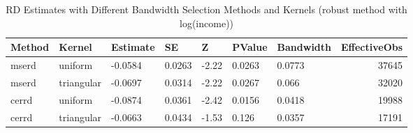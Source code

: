\begin{table}[ht]
\centering
\caption{RD Estimates with Different Bandwidth Selection Methods and Kernels (robust method with log(income))} 
\label{tab:rd_bandwidth_kernel_results_robust}
\begin{tabular}{lllllllr}
  \hline
Method & Kernel & Estimate & SE & Z & PValue & Bandwidth & EffectiveObs \\ 
  \hline
mserd & uniform & -0.0584 & 0.0263 & -2.22 & 0.0263 & 0.0773 & 37645 \\ 
  mserd & triangular & -0.0697 & 0.0314 & -2.22 & 0.0267 & 0.066 & 32020 \\ 
  cerrd & uniform & -0.0874 & 0.0361 & -2.42 & 0.0156 & 0.0418 & 19988 \\ 
  cerrd & triangular & -0.0663 & 0.0434 & -1.53 & 0.126 & 0.0357 & 17191 \\ 
   \hline
\end{tabular}
\end{table}

